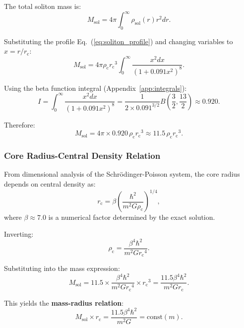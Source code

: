 \documentclass[11pt,a4paper]{article}
\newcommand{\Msol}{\ensuremath{M_{\mathrm{sol}}}}
\newcommand{\rc}{\ensuremath{r_{\mathrm{c}}}}
\newcommand{\rhoc}{\ensuremath{\rho_{\mathrm{c}}}}
\theoremstyle{definition}
\theoremstyle{remark}
\begin{document}
The total soliton mass is:
\begin{equation}
\Msol = 4\pi \int_0^\infty \rho_{\mathrm{sol}}(r) r^2 dr.
\end{equation}

Substituting the profile Eq.~(\ref{eq:soliton_profile}) and changing variables to $x = r/\rc$:
\begin{equation}
\Msol = 4\pi \rhoc \rc^3 \int_0^\infty \frac{x^2 dx}{(1 + 0.091 x^2)^8}.
\end{equation}

Using the beta function integral (Appendix~\ref{app:integrals}):
\begin{equation}
I = \int_0^\infty \frac{x^2 dx}{(1 + 0.091 x^2)^8} = \frac{1}{2 \times 0.091^{3/2}} B\left(\frac{3}{2}, \frac{13}{2}\right) \approx 0.920.
\end{equation}

Therefore:
\begin{equation}
\Msol = 4\pi \times 0.920 \, \rhoc \rc^3 \approx 11.5 \, \rhoc \rc^3.
\end{equation}

\subsubsection{Core Radius-Central Density Relation}

From dimensional analysis of the Schr\"odinger-Poisson system, the core radius depends on central density as:
\begin{equation}
\label{eq:rc_rhoc}
\rc = \beta \left(\frac{\hbar^2}{m^2 G \rhoc}\right)^{1/4},
\end{equation}
where $\beta \approx 7.0$ is a numerical factor determined by the exact solution.

Inverting:
\begin{equation}
\rhoc = \frac{\beta^4 \hbar^2}{m^2 G \rc^4}.
\end{equation}

Substituting into the mass expression:
\begin{equation}
\Msol = 11.5 \times \frac{\beta^4 \hbar^2}{m^2 G \rc^4} \times \rc^3 = \frac{11.5 \beta^4 \hbar^2}{m^2 G \rc}.
\end{equation}

This yields the \textbf{mass-radius relation}:
\begin{equation}
\label{eq:mass_radius}
\boxed{\Msol \times \rc = \frac{11.5 \beta^4 \hbar^2}{m^2 G} = \text{const}(m).}
\end{equation}
\end{document}
